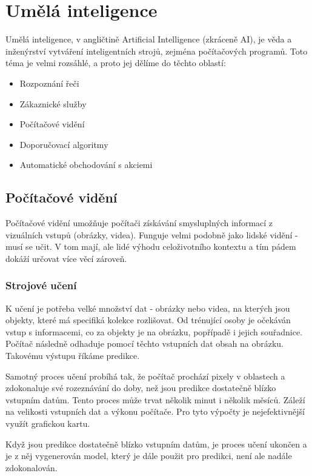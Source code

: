 \section{Umělá inteligence}
Umělá inteligence, v angličtině Artificial Intelligence (zkráceně AI), je věda a inženýrství vytváření inteligentních strojů, zejména počítačových programů.\cite{What-is-AI} Toto téma je velmi rozsáhlé, a proto jej dělíme do těchto oblastí\cite{IBM-AI}:
\begin{itemize}
	\item Rozpoznání řeči
	\item Zákaznické služby
	\item Počítačové vidění
	\item Doporučovací algoritmy
	\item Automatické obchodování s akciemi
\end{itemize}

\subsection{Počítačové vidění}
Počítačové vidění umožňuje počítači získávání smysluplných informací z vizuálních vstupů (obrázky, videa). \cite{IBM-CV} Funguje velmi podobně jako lidské vidění - musí se učit. V tom mají, ale lidé výhodu celoživotního kontextu a tím pádem dokáží určovat více věcí zároveň.\par

\subsubsection{Strojové učení}
K učení je potřeba velké množství dat - obrázky nebo videa, na kterých jsou objekty, které má specifiká kolekce rozlišovat. Od trénující osoby je očekáván vstup s informacemi, co za objekty je na obrázku, popřípadě i jejich souřadnice. Počítač následně odhaduje pomocí těchto vstupních dat obsah na obrázku. Takovému výstupu říkáme predikce.\par
Samotný proces učení probíhá tak, že počítač prochází pixely v oblastech a zdokonaluje své rozeznávání do doby, než jsou predikce dostatečně blízko vstupním datům. Tento proces může trvat několik minut i několik měsíců. Záleží na velikosti vstupních dat a výkonu počítače. Pro tyto výpočty je nejefektivnější využít grafickou kartu.\par
Když jsou predikce dostatečně blízko vstupním datům, je proces učení ukončen a je z něj vygenerován model, který je dále použit pro predikci, není ale nadále zdokonalován. 


